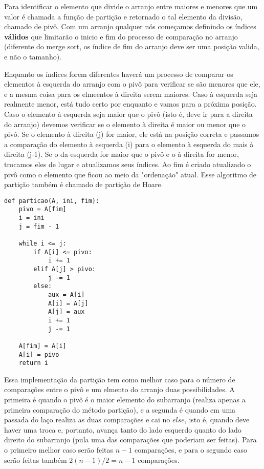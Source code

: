 \documentclass[a4paper, twocolumn]{article}
\theoremstyle{definition}
\begin{document}
Para identificar o elemento que divide o arranjo entre maiores e menores que um valor é chamada a função de partição e retornado o tal elemento da divisão, chamado de pivô. Com um arranjo qualquer nós começamos definindo os índices \textbf{válidos} que limitarão o inicio e fim do processo de comparação no arranjo (diferente do merge sort, os índice de fim do arranjo deve ser uma posição valida, e não o tamanho). 

Enquanto os índices forem diferentes haverá um processo de comparar os elementos à esquerda do arranjo com o pivô para  verificar se são menores que ele, e a mesma coisa para os elmeentos à direita serem maiores. Caso à esquerda seja realmente menor, está tudo certo por enquanto e vamos para a próxima posição. Caso o elemento à esquerda seja maior que o pivô (isto é, deve ir para a direita do arranjo) devemos verificar se o elemento à direita é maior ou menor que o pivô. Se o elemento à direita (j) for maior, ele está na posição correta e passamos a comparação do elemento à esquerda (i) para o elemento à esquerda do mais à direita (j-1). Se o da  esquerda for maior que o pivô e o à direita for menor, trocamos eles de lugar e atualizamos seus índices. Ao fim é criado atualizado o pivô como o elemento que ficou ao meio da "ordenação" atual. Esse algoritmo de partição também é chamado de partição de Hoare.

\begin{lstlisting}[label=quick_sort,caption= Partição]
def particao(A, ini, fim):
    pivo = A[fim]
    i = ini
    j = fim - 1

    while i <= j:
        if A[i] <= pivo:
            i += 1
        elif A[j] > pivo:
            j -= 1
        else:
            aux = A[i]
            A[i] = A[j]
            A[j] = aux
            i += 1
            j -= 1
    
    A[fim] = A[i]
    A[i] = pivo
    return i
\end{lstlisting}

Essa implementação da partição tem como melhor caso para o número de comparações entre o pivô e um elmento do arranjo duas possibilidades. A primeira é quando o pivô é o maior elemento do subarranjo (realiza apenas a primeira comparação do método partição), e a segunda é quando em uma passada do laço realiza as duas comparações e cai no $else$, isto é, quando deve haver uma troca e, portanto, avança tanto do lado esquerdo quanto do lado direito do subarranjo (pula uma das comparações que poderiam ser feitas). Para o primeiro melhor caso serão feitas $n-1$ comparações, e para o segundo caso serão feitas também $2(n-1)/2 = n-1$ comparações.
\end{document}
